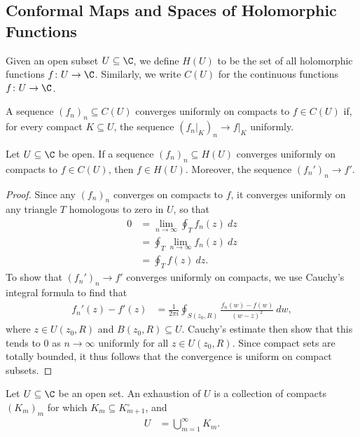\documentclass[10pt]{mypackage}
\begin{document}
\subsection{Conformal Maps and Spaces of Holomorphic Functions}%
Given an open subset $U\subseteq \C$, we define $H(U)$ to be the set of all holomorphic functions $f\colon U\rightarrow \C$. Similarly, we write $C(U)$ for the continuous functions $f\colon U\rightarrow \C$.
\begin{definition}
  A sequence $\left( f_n \right)_n\subseteq C(U)$ converges uniformly on compacts to $f\in C(U)$ if, for every compact $K\subseteq U$, the sequence $\left( f_n|_{K} \right)_{n}\rightarrow f|_{K}$ uniformly.
\end{definition}
\begin{proposition}
  Let $U\subseteq \C$ be open. If a sequence $\left( f_n \right)_n\subseteq H(U)$ converges uniformly on compacts to $f\in C(U)$, then $f\in H(U)$. Moreover, the sequence $\left( f_n' \right)_{n}\rightarrow f'$.
\end{proposition}
\begin{proof}
  Since any $\left( f_n \right)_n$ converges on compacts to $f$, it converges uniformly on any triangle $T$ homologous to zero in $U$, so that
  \begin{align*}
    0 &= \lim_{n\rightarrow\infty} \oint_{T}^{} f_n(z)\:dz\\
      &= \oint_{T}^{} \lim_{n\rightarrow\infty}f_n(z)\:dz\\
      &= \oint_{T}^{} f(z)\:dz.
  \end{align*}
  To show that $\left( f_n' \right)_n\rightarrow f'$ converges uniformly on compacts, we use Cauchy's integral formula to find that
  \begin{align*}
    f_n'(z)-f'(z) &= \frac{1}{2\pi i} \oint_{S\left( z_0,R \right)}^{} \frac{f_n\left( w \right)-f\left( w \right)}{\left( w - z \right)^2}\:dw,
  \end{align*}
  where $z\in U\left( z_0,R \right)$ and $B\left( z_0,R \right)\subseteq U$. Cauchy's estimate then show that this tends to $0$ as $n\rightarrow\infty$ uniformly for all $z\in U\left( z_0,R \right)$. Since compact sets are totally bounded, it thus follows that the convergence is uniform on compact subsets.
\end{proof}
\begin{definition}
  Let $U\subseteq \C$ be an open set. An exhaustion of $U$ is a collection of compacts $\left( K_m \right)_m$ for which $K_m\subseteq K_{m+1}^{\circ}$, and
  \begin{align*}
    U &= \bigcup_{m=1}^{\infty}K_m.
  \end{align*}
\end{definition}
\end{document}
